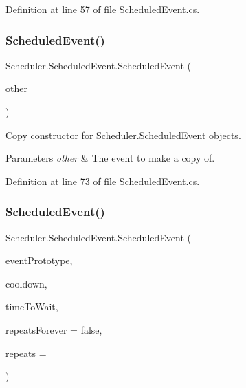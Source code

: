 Definition at line 57 of file Scheduled\+Event.\+cs.

\mbox{\label{class_scheduler_1_1_scheduled_event_a5c66e685b9eee065a1ff446c6b9eb68c}} 
\subsubsection{\texorpdfstring{Scheduled\+Event()}{ScheduledEvent()}\hspace{0.1cm}{\footnotesize\ttfamily [3/6]}}
{\footnotesize\ttfamily Scheduler.\+Scheduled\+Event.\+Scheduled\+Event (\begin{DoxyParamCaption}\item[{\hyperlink{class_scheduler_1_1_scheduled_event}{Scheduled\+Event}}]{other }\end{DoxyParamCaption})}



Copy constructor for \hyperlink{class_scheduler_1_1_scheduled_event}{Scheduler.\+Scheduled\+Event} objects. 


\begin{DoxyParams}{Parameters}
{\em other} & The event to make a copy of.\\
\hline
\end{DoxyParams}


Definition at line 73 of file Scheduled\+Event.\+cs.

\mbox{\label{class_scheduler_1_1_scheduled_event_a20a4e01a2ca9a54ed32f7f671f264a22}} 
\subsubsection{\texorpdfstring{Scheduled\+Event()}{ScheduledEvent()}\hspace{0.1cm}{\footnotesize\ttfamily [4/6]}}
{\footnotesize\ttfamily Scheduler.\+Scheduled\+Event.\+Scheduled\+Event (\begin{DoxyParamCaption}\item[{\hyperlink{class_scheduler_1_1_scheduled_event}{Scheduled\+Event}}]{event\+Prototype,  }\item[{float}]{cooldown,  }\item[{float}]{time\+To\+Wait,  }\item[{bool}]{repeats\+Forever = {\ttfamily false},  }\item[{int}]{repeats = {} }\end{DoxyParamCaption})}




